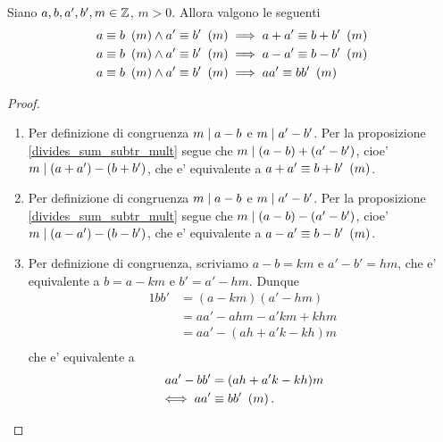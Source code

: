 \begin{proposition}
    Siano $a, b, a', b', m \in \mathbb{Z}$, $m > 0$. Allora valgono le seguenti
    \begin{align}
        &a \equiv b \ \left(m\right)\land a' \equiv b' \ \left(m\right)\implies a+a' \equiv b+b'\ \left(m\right) \label{somma_congrui}\\
        &a \equiv b \ \left(m\right)\land a' \equiv b' \ \left(m\right)\implies a-a' \equiv b-b'\ \left(m\right) \label{differenza_congrui}\\
        &a \equiv b \ \left(m\right)\land a' \equiv b' \ \left(m\right)\implies aa' \equiv bb'\ \left(m\right) \label{prodotto_congrui}
    \end{align}
\end{proposition}
\begin{proof}
    \begin{enumerate}
        \item Per definizione di congruenza $m \mid a - b$ e $m \mid a' - b'$. Per la proposizione \ref{divides_sum_subtr_mult} segue che $m \mid (a - b) + (a' - b')$, cioe' $m \mid (a + a') - (b + b')$, che e' equivalente a $a+a' \equiv b+b'\ \left(m\right)$.
        \item Per definizione di congruenza $m \mid a - b$ e $m \mid a' - b'$. Per la proposizione \ref{divides_sum_subtr_mult} segue che $m \mid (a - b) - (a' - b')$, cioe' $m \mid (a - a') - (b - b')$, che e' equivalente a $a-a' \equiv b-b'\ \left(m\right)$.
        \item Per definizione di congruenza, scriviamo $a - b = km$ e $a' - b' = hm$, che e' equivalente a $b = a - km$ e $b' = a' - hm$. Dunque
        \begin{alignat*}
            {1}
            bb' &= (a - km)(a' - hm) \\
                &= aa' - ahm - a'km + khm \\
                &= aa' - (ah + a'k - kh)m \\
        \end{alignat*}    
        che e' equivalente a
        \begin{alignat*} {1}
            aa' - bb' &= (ah + a'k - kh)m \\
            \iff aa' &\equiv bb' \ \left(m\right).
        \end{alignat*}
        
    \end{enumerate}
    
\end{proof}


